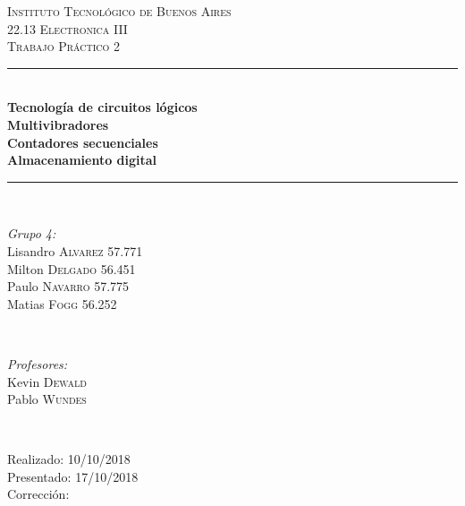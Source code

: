 \begin{titlepage}
\newcommand{\HRule}{\rule{\linewidth}{0.5mm}}
\center
\textsc{\LARGE Instituto Tecnológico de Buenos Aires}\\[1.5cm]
\textsc{\Large 22.13 Electronica III}\\[0.5cm]
\textsc{\large Trabajo Práctico 2}\\[0.5cm]

\HRule \\[0.4cm]
{ \huge \bfseries Tecnología de circuitos lógicos\\Multivibradores\\Contadores secuenciales\\Almacenamiento digital}\\[0.4cm] %
\HRule \\[1.5cm]

\begin{minipage}{0.4\textwidth}
\begin{flushleft} \large
\emph{Grupo 4:}\\
Lisandro \textsc{Alvarez} 57.771\\
Milton \textsc{Delgado} 56.451\\
Paulo \textsc{Navarro} 57.775\\
Matias \textsc{Fogg} 56.252\\
\end{flushleft}
\end{minipage}
~
\begin{minipage}{0.4\textwidth}
\begin{flushright} \large
\emph{Profesores:} \\
Kevin \textsc{Dewald}\\
Pablo \textsc{Wundes}
\end{flushright}
\end{minipage}\\[4cm]

\begin{minipage}{0.4\textwidth}
\begin{flushleft} \large
Realizado: 10/10/2018\\
Presentado: 17/10/2018\\
Corrección:\\
\end{flushleft}
\end{minipage}
\vfill %

\end{titlepage}